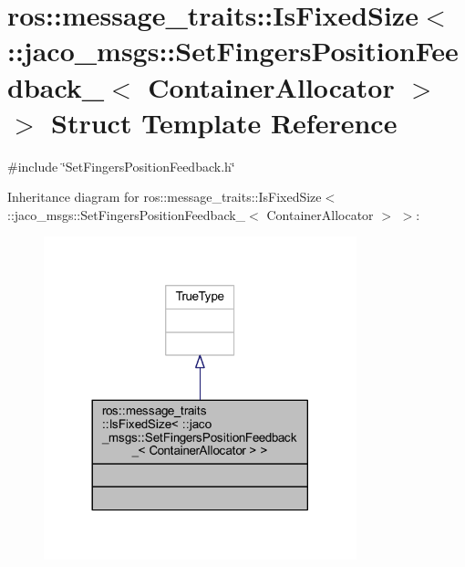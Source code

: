 \hypertarget{structros_1_1message__traits_1_1IsFixedSize_3_01_1_1jaco__msgs_1_1SetFingersPositionFeedback___3_01ContainerAllocator_01_4_01_4}{}\section{ros\+:\+:message\+\_\+traits\+:\+:Is\+Fixed\+Size$<$ \+:\+:jaco\+\_\+msgs\+:\+:Set\+Fingers\+Position\+Feedback\+\_\+$<$ Container\+Allocator $>$ $>$ Struct Template Reference}
\label{structros_1_1message__traits_1_1IsFixedSize_3_01_1_1jaco__msgs_1_1SetFingersPositionFeedback___3_01ContainerAllocator_01_4_01_4}


{\ttfamily \#include \char`\"{}Set\+Fingers\+Position\+Feedback.\+h\char`\"{}}



Inheritance diagram for ros\+:\+:message\+\_\+traits\+:\+:Is\+Fixed\+Size$<$ \+:\+:jaco\+\_\+msgs\+:\+:Set\+Fingers\+Position\+Feedback\+\_\+$<$ Container\+Allocator $>$ $>$\+:
\nopagebreak
\begin{figure}[H]
\begin{center}
\leavevmode
\includegraphics[width=257pt]{de/d08/structros_1_1message__traits_1_1IsFixedSize_3_01_1_1jaco__msgs_1_1SetFingersPositionFeedback___3c5841e4be94fdb467bf9264fe2afe522}
\end{center}
\end{figure}


